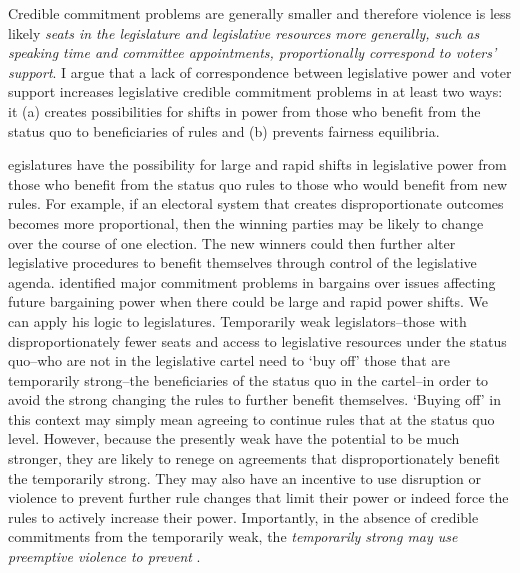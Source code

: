 \documentclass[a4paper]{article}\usepackage[]{graphicx}\usepackage[]{color}
\begin{document}
Credible commitment problems are generally smaller and therefore violence is less likely \emph{ seats in the legislature and legislative resources more generally, such as speaking time and committee appointments, proportionally correspond to voters' support}.   I argue that a lack of correspondence between legislative power and voter support increases legislative credible commitment problems in at least two ways: it (a) creates possibilities for shifts in power from those who benefit from the status quo to beneficiaries of  rules  and (b) prevents fairness equilibria.

egislatures have the possibility for large and rapid shifts in legislative power from those who benefit from the status quo rules to those who would benefit from new rules. For example, if an electoral system that creates disproportionate outcomes becomes more proportional, then the winning parties may be likely to change over the course of one election. The new winners could then further alter legislative procedures  to benefit themselves through control of the legislative agenda. \cite{Powell2004,Powell2006} identified major commitment problems in bargains over issues affecting future bargaining power when there could be large and rapid power shifts. We can apply his logic to legislatures. Temporarily weak legislators--those with disproportionately fewer seats and access to legislative resources under the status quo--who are not in the legislative cartel need to `buy off' those that are temporarily strong--the beneficiaries of the status quo in the cartel--in order to avoid the strong changing the rules to further benefit themselves. `Buying off' in this context may simply mean agreeing to continue rules that  at the status quo level. However, because the presently weak have the potential to be much stronger, they are likely to renege on agreements that disproportionately benefit the temporarily strong. They may also have an incentive to use disruption or violence to prevent further rule changes that limit their power or indeed force the rules to   actively increase their power. Importantly, in the absence of credible commitments from the temporarily weak, the \emph{temporarily strong may use preemptive violence to prevent }.
\end{document}
